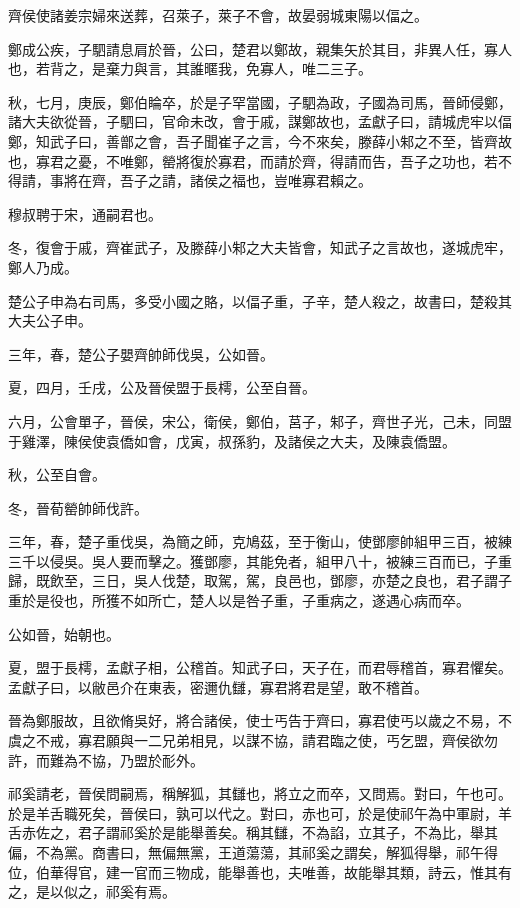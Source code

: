 \begin{pinyinscope}
齊侯使諸姜宗婦來送葬，召萊子，萊子不會，故晏弱城東陽以偪之。

鄭成公疾，子駟請息肩於晉，公曰，楚君以鄭故，親集矢於其目，非異人任，寡人也，若背之，是棄力與言，其誰暱我，免寡人，唯二三子。

秋，七月，庚辰，鄭伯睔卒，於是子罕當國，子駟為政，子國為司馬，晉師侵鄭，諸大夫欲從晉，子駟曰，官命未改，會于戚，謀鄭故也，孟獻子曰，請城虎牢以偪鄭，知武子曰，善鄫之會，吾子聞崔子之言，今不來矣，滕薛小邾之不至，皆齊故也，寡君之憂，不唯鄭，罃將復於寡君，而請於齊，得請而告，吾子之功也，若不得請，事將在齊，吾子之請，諸侯之福也，豈唯寡君賴之。

穆叔聘于宋，通嗣君也。

冬，復會于戚，齊崔武子，及滕薛小邾之大夫皆會，知武子之言故也，遂城虎牢，鄭人乃成。

楚公子申為右司馬，多受小國之賂，以偪子重，子辛，楚人殺之，故書曰，楚殺其大夫公子申。

三年，春，楚公子嬰齊帥師伐吳，公如晉。

夏，四月，壬戌，公及晉侯盟于長樗，公至自晉。

六月，公會單子，晉侯，宋公，衛侯，鄭伯，莒子，邾子，齊世子光，己未，同盟于雞澤，陳侯使袁僑如會，戊寅，叔孫豹，及諸侯之大夫，及陳袁僑盟。

秋，公至自會。

冬，晉荀罃帥師伐許。

三年，春，楚子重伐吳，為簡之師，克鳩茲，至于衡山，使鄧廖帥組甲三百，被練三千以侵吳。吳人要而擊之。獲鄧廖，其能免者，組甲八十，被練三百而已，子重歸，既飲至，三日，吳人伐楚，取駕，駕，良邑也，鄧廖，亦楚之良也，君子謂子重於是役也，所獲不如所亡，楚人以是咎子重，子重病之，遂遇心病而卒。

公如晉，始朝也。

夏，盟于長樗，孟獻子相，公稽首。知武子曰，天子在，而君辱稽首，寡君懼矣。孟獻子曰，以敝邑介在東表，密邇仇讎，寡君將君是望，敢不稽首。

晉為鄭服故，且欲脩吳好，將合諸侯，使士丐告于齊曰，寡君使丐以歲之不易，不虞之不戒，寡君願與一二兄弟相見，以謀不協，請君臨之使，丐乞盟，齊侯欲勿許，而難為不協，乃盟於耏外。

祁奚請老，晉侯問嗣焉，稱解狐，其讎也，將立之而卒，又問焉。對曰，午也可。於是羊舌職死矣，晉侯曰，孰可以代之。對曰，赤也可，於是使祁午為中軍尉，羊舌赤佐之，君子謂祁奚於是能舉善矣。稱其讎，不為諂，立其子，不為比，舉其偏，不為黨。商書曰，無偏無黨，王道蕩蕩，其祁奚之謂矣，解狐得舉，祁午得位，伯華得官，建一官而三物成，能舉善也，夫唯善，故能舉其類，詩云，惟其有之，是以似之，祁奚有焉。


\end{pinyinscope}
